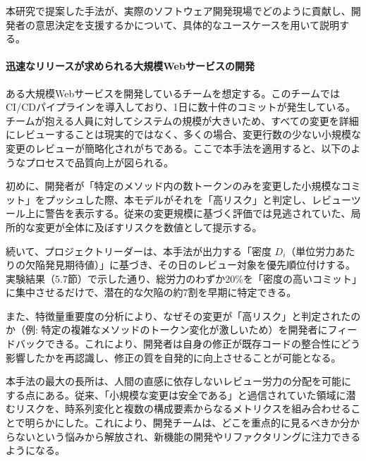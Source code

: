 本研究で提案した手法が、実際のソフトウェア開発現場でどのように貢献し、開発者の意思決定を支援するかについて、具体的なユースケースを用いて説明する。

\paragraph{迅速なリリースが求められる大規模Webサービスの開発}
ある大規模Webサービスを開発しているチームを想定する。このチームではCI/CDパイプラインを導入しており、1日に数十件のコミットが発生している。チームが抱える人員に対してシステムの規模が大きいため、すべての変更を詳細にレビューすることは現実的ではなく、多くの場合、変更行数の少ない小規模な変更のレビューが簡略化されがちである。ここで本手法を適用すると、以下のようなプロセスで品質向上が図られる。

初めに、開発者が「特定のメソッド内の数トークンのみを変更した小規模なコミット」をプッシュした際、本モデルがそれを「高リスク」と判定し、レビューツール上に警告を表示する。従来の変更規模に基づく評価では見逃されていた、局所的な変更が全体に及ぼすリスクを数値として提示する。

続いて、プロジェクトリーダーは、本手法が出力する「密度 $D_{i}$（単位労力あたりの欠陥発見期待値）」に基づき、その日のレビュー対象を優先順位付けする。実験結果（5.7節）で示した通り、総労力のわずか20\%を「密度の高いコミット」に集中させるだけで、潜在的な欠陥の約7割を早期に特定できる。

また、特徴量重要度の分析により、なぜその変更が「高リスク」と判定されたのか（例: 特定の複雑なメソッドのトークン変化が激しいため）を開発者にフィードバックできる。これにより、開発者は自身の修正が既存コードの整合性にどう影響したかを再認識し、修正の質を自発的に向上させることが可能となる。

本手法の最大の長所は、人間の直感に依存しないレビュー労力の分配を可能にする点にある。従来、「小規模な変更は安全である」と過信されていた領域に潜むリスクを、時系列変化と複数の構成要素からなるメトリクスを組み合わせることで明らかにした。これにより、開発チームは、どこを重点的に見るべきか分からないという悩みから解放され、新機能の開発やリファクタリングに注力できるようになる。